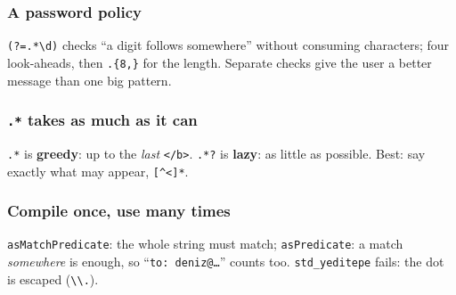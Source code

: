 \documentclass[aspectratio=169,10pt,compress]{beamer}
\begin{document}




\begin{frame}[t,fragile] \frametitle{A password policy}

  \vspace{0.2em}
  \small \texttt{(?=.*\textbackslash d)} checks ``a digit follows somewhere'' without consuming characters; four look-aheads, then \texttt{.\{8,\}} for the length.
  Separate checks give the user a better message than one big pattern.
\end{frame}





\begin{frame}[t,fragile] \frametitle{\texttt{.*} takes as much as it can}

  \vspace{0.2em}
  \small \texttt{.*} is \textbf{greedy}: up to the \emph{last} \texttt{</b>}. \texttt{.*?} is \textbf{lazy}: as little as possible. Best: say exactly what may appear, \texttt{[\textasciicircum<]*}.
\end{frame}





\begin{frame}[t,fragile] \frametitle{Compile once, use many times}

  \vspace{0.2em}
  \small \texttt{asMatchPredicate}: the whole string must match; \texttt{asPredicate}: a match \emph{somewhere} is enough, so
  ``\texttt{to: deniz@\dots}'' counts too. \texttt{std\_yeditepe} fails: the dot is escaped (\texttt{\textbackslash\textbackslash .}).
\end{frame}
\end{document}
